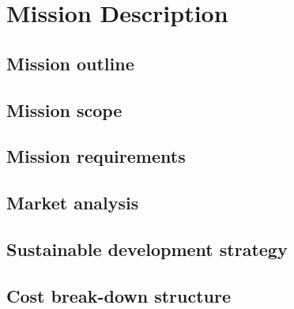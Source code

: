 \section{Mission Description}\label{cha:missiondescr}

\subsection{Mission outline} \label{sec:missionoutline}


\subsection{Mission scope} \label{sec:missionscope}


\subsection{Mission requirements} \label{sec:missionreq}


\subsection{Market analysis} \label{sec:marketanalysis}


\subsection{Sustainable development strategy} \label{sec:sustainable}


\subsection{Cost break-down structure} \label{sec:costbreakdown}


%

